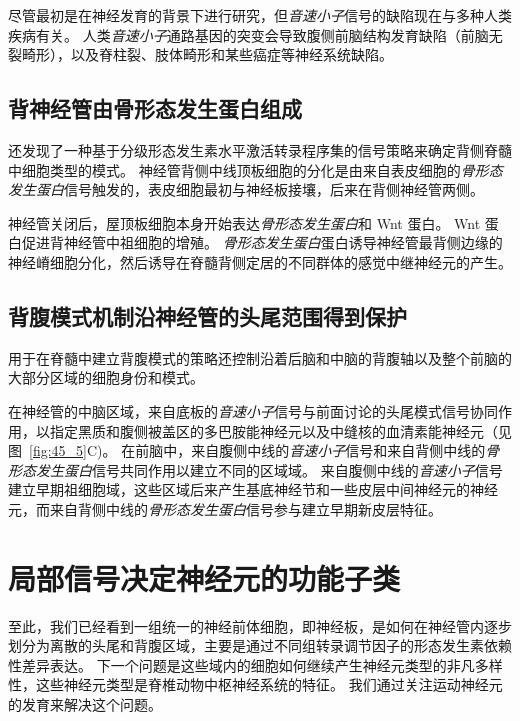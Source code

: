 尽管最初是在神经发育的背景下进行研究，但\textit{音速小子}信号的缺陷现在与多种人类疾病有关。
人类\textit{音速小子}通路基因的突变会导致腹侧前脑结构发育缺陷（前脑无裂畸形），以及脊柱裂、肢体畸形和某些癌症等神经系统缺陷。



\subsection{背神经管由骨形态发生蛋白组成}

还发现了一种基于分级形态发生素水平激活转录程序集的信号策略来确定背侧脊髓中细胞类型的模式。
神经管背侧中线顶板细胞的分化是由来自表皮细胞的\textit{骨形态发生蛋白}信号触发的，表皮细胞最初与神经板接壤，后来在背侧神经管两侧。


神经管关闭后，屋顶板细胞本身开始表达\textit{骨形态发生蛋白}和 Wnt 蛋白。
Wnt 蛋白促进背神经管中祖细胞的增殖。
\textit{骨形态发生蛋白}蛋白诱导神经管最背侧边缘的神经嵴细胞分化，然后诱导在脊髓背侧定居的不同群体的感觉中继神经元的产生。



\subsection{背腹模式机制沿神经管的头尾范围得到保护}

用于在脊髓中建立背腹模式的策略还控制沿着后脑和中脑的背腹轴以及整个前脑的大部分区域的细胞身份和模式。


在神经管的中脑区域，来自底板的\textit{音速小子}信号与前面讨论的头尾模式信号协同作用，以指定黑质和腹侧被盖区的多巴胺能神经元以及中缝核的血清素能神经元（见图~\ref{fig:45_5}C)。
在前脑中，来自腹侧中线的\textit{音速小子}信号和来自背侧中线的\textit{骨形态发生蛋白}信号共同作用以建立不同的区域域。
来自腹侧中线的\textit{音速小子}信号建立早期祖细胞域，这些区域后来产生基底神经节和一些皮层中间神经元的神经元，而来自背侧中线的\textit{骨形态发生蛋白}信号参与建立早期新皮层特征。



\section{局部信号决定神经元的功能子类}

至此，我们已经看到一组统一的神经前体细胞，即神经板，是如何在神经管内逐步划分为离散的头尾和背腹区域，主要是通过不同组转录调节因子的形态发生素依赖性差异表达。
下一个问题是这些域内的细胞如何继续产生神经元类型的非凡多样性，这些神经元类型是脊椎动物中枢神经系统的特征。
我们通过关注运动神经元的发育来解决这个问题。


